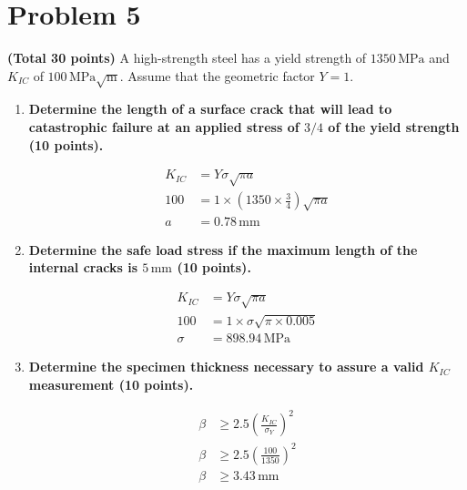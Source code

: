 \documentclass[10pt]{article}
\begin{document}
\section*{Problem 5}
\noindent \textbf{(Total 30 points)} A high-strength steel has a yield strength of \(1350 \, \text{MPa}\) and \(K_{IC}\) of \(100 \, \text{MPa} \sqrt{\text{m}}\). Assume that the geometric factor \(Y = 1\).

\begin{enumerate}
    \item[(a)] \textbf{Determine the length of a surface crack that will lead to catastrophic failure at an applied stress of \(3/4\) of the yield strength (10 points).}

    \begin{align*}
        K_{IC} &= Y \sigma \sqrt{\pi a} \\
        100 &= 1 \times \left(1350 \times \frac{3}{4}\right) \sqrt{\pi a} \\
        a &= 0.78 \, \text{mm}
    \end{align*}

    \item[(b)] \textbf{Determine the safe load stress if the maximum length of the internal cracks is \(5 \, \text{mm}\) (10 points).}

    \begin{align*}
        K_{IC} &= Y \sigma \sqrt{\pi a} \\
        100 &= 1 \times \sigma \sqrt{\pi \times 0.005} \\
        \sigma &= 898.94 \, \text{MPa}
    \end{align*}

    \item[(c)] \textbf{Determine the specimen thickness necessary to assure a valid \(K_{IC}\) measurement (10 points).}

    \begin{align*}
        \beta &\geq 2.5 \left(\frac{K_{IC}}{\sigma_Y}\right)^2 \\
        \beta &\geq 2.5 \left(\frac{100}{1350}\right)^2 \\
        \beta &\geq 3.43 \, \text{mm}
    \end{align*}
\end{enumerate}
\end{document}
